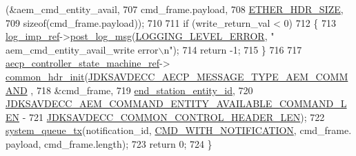 \begin{DoxyCode}
      (&aem\_cmd\_entity\_avail,
707                                                                              cmd\_frame.payload,
708                                                                              
      \hyperlink{namespaceavdecc__lib_a6c827b1a0d973e18119c5e3da518e65ca9512ad9b34302ba7048d88197e0a2dc0}{ETHER\_HDR\_SIZE},
709                                                                              \textcolor{keyword}{sizeof}(cmd\_frame.payload));
710 
711     \textcolor{keywordflow}{if} (write\_return\_val < 0)
712     \{
713         \hyperlink{namespaceavdecc__lib_acbe3e2a96ae6524943ca532c87a28529}{log\_imp\_ref}->\hyperlink{classavdecc__lib_1_1log_a68139a6297697e4ccebf36ccfd02e44a}{post\_log\_msg}(\hyperlink{namespaceavdecc__lib_a501055c431e6872ef46f252ad13f85cdaf2c4481208273451a6f5c7bb9770ec8a}{LOGGING\_LEVEL\_ERROR}, \textcolor{stringliteral}{"
      aem\_cmd\_entity\_avail\_write error\(\backslash\)n"});
714         \textcolor{keywordflow}{return} -1;
715     \}
716 
717     \hyperlink{namespaceavdecc__lib_a0b1b5aea3c0490f77cbfd9178af5be22}{aecp\_controller\_state\_machine\_ref}->
      \hyperlink{classavdecc__lib_1_1aecp__controller__state__machine_aafc737d7ed17a62fed9df6528f18d3ec}{common\_hdr\_init}(\hyperlink{group__aecp__message__type_ga4625ce189cc209f42deb0629f48faf69}{JDKSAVDECC\_AECP\_MESSAGE\_TYPE\_AEM\_COMMAND}
      ,
718                                                        &cmd\_frame,
719                                                        \hyperlink{classavdecc__lib_1_1end__station__imp_ac32ac278fb799e1b4f0cd539e0abe2b5}{end\_station\_entity\_id},
720                                                        
      \hyperlink{group__command__entity__available_ga30ae597e2bbf5439d01764cc00618fd7}{JDKSAVDECC\_AEM\_COMMAND\_ENTITY\_AVAILABLE\_COMMAND\_LEN} -
721                                                            
      \hyperlink{group__jdksavdecc__avtp__common__control__header_gaae84052886fb1bb42f3bc5f85b741dff}{JDKSAVDECC\_COMMON\_CONTROL\_HEADER\_LEN});
722     \hyperlink{namespaceavdecc__lib_a6dd511685627c0865a3442b539a4e8e9}{system\_queue\_tx}(notification\_id, \hyperlink{namespaceavdecc__lib_aabcadff06aa62be0ce47bc0646823604aba48b8a017e06fb240b650cdea965178}{CMD\_WITH\_NOTIFICATION}, cmd\_frame.
      payload, cmd\_frame.length);
723     \textcolor{keywordflow}{return} 0;
724 \}
\end{DoxyCode}


